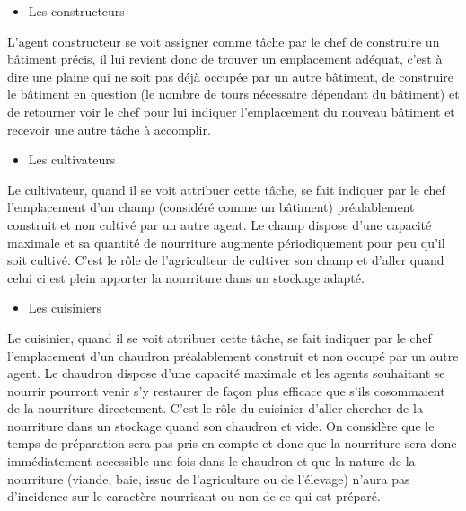 \documentclass[12pt]{article}
\begin{document}
		\begin{itemize}
		\item Les constructeurs\\
		\end{itemize}

L'agent constructeur se voit assigner comme tâche par le chef de construire un 
bâtiment précis, il lui revient donc de trouver un emplacement adéquat, c'est à
dire une plaine qui ne soit pas déjà occupée par un autre bâtiment, de 
construire le bâtiment en question (le nombre de tours nécessaire dépendant du 
bâtiment) et de retourner voir le chef pour lui indiquer l'emplacement du 
nouveau bâtiment et recevoir une autre tâche à accomplir.\\

		\begin{itemize}
		\item Les cultivateurs\\
		\end{itemize}

Le cultivateur, quand il se voit attribuer cette tâche, se fait indiquer par le 
chef l'emplacement d'un champ (considéré comme un bâtiment) préalablement 
construit et non cultivé par un autre agent. Le champ dispose d'une capacité 
maximale et sa quantité de nourriture augmente périodiquement pour peu qu'il 
soit cultivé. C'est le rôle de l'agriculteur de cultiver son champ et d'aller 
quand celui ci est plein apporter la nourriture dans un stockage adapté.\\

		\begin{itemize}
		\item Les cuisiniers\\
		\end{itemize}

Le cuisinier, quand il se voit attribuer cette tâche, se fait indiquer par le 
chef l'emplacement d'un chaudron préalablement construit et non occupé par 
un autre agent. Le chaudron dispose d'une capacité maximale et les agents 
souhaitant se nourrir pourront venir s'y restaurer de façon plus efficace que 
s'ils cosommaient de la nourriture directement. C'est le rôle du cuisinier 
d'aller chercher de la nourriture dans un stockage quand son chaudron et vide.
On considère que le temps de préparation sera pas pris en compte et donc que 
la nourriture sera donc immédiatement accessible une fois dans le chaudron et 
que la nature de la nourriture (viande, baie, issue de l'agriculture ou de 
l'élevage) n'aura pas d'incidence sur le caractère nourrisant ou non de ce qui 
est préparé.\\
\end{document}
